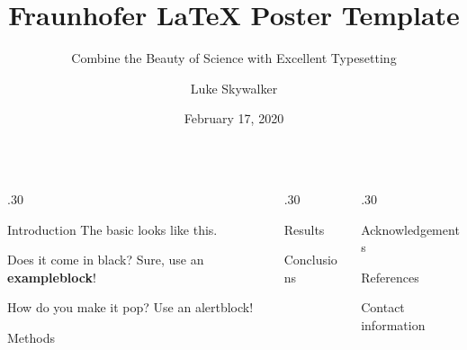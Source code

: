 \documentclass{beamer}
\author{Luke Skywalker}
\title{Fraunhofer {\LaTeX} Poster Template}
\subtitle{Combine the Beauty of Science with Excellent Typesetting}
\date[International Symposium on Typography 2020]{February 17, 2020}
\begin{document}
\begin{frame}
\maketitle
\begin{columns}[onlytextwidth,t]
\begin{column}{.30\textwidth}
  \begin{block}{Introduction}
    The basic  looks like this.
  \end{block}
  \begin{exampleblock}{Does it come in black?}
    Sure, use an \textbf{exampleblock}!
  \end{exampleblock}
  \begin{alertblock}{How do you make it pop?}
    Use an \alert{alertblock}!
  \end{alertblock}
  \begin{block}{Methods}
    \lipsum[1]
  \end{block}
\end{column}
\begin{column}{.30\textwidth}
  \begin{block}{Results}
    \lipsum[2]
    \unskip
  \end{block}
  \begin{block}{Conclusions}
    \lipsum[4]
  \end{block}
\end{column}
\begin{column}{.30\textwidth}
  \begin{block}{Acknowledgements}
    \lipsum[5]
  \end{block}
  \begin{block}{References}
    \lipsum[6]
  \end{block}
  \begin{block}{Contact information}
    \lipsum[7]
  \end{block}
\end{column}
\end{columns}
\end{frame}
\end{document}
